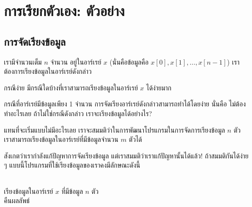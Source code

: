 \chapter{การ{\wbr}เรียก{\wbr}ตัวเอง: ตัวอย่าง}

\section{การ{\wbr}จัดเรียง{\wbr}ข้อมูล}

เรา{\wbr}มี{\wbr}จำนวนเต็ม $n$ จำนวน อยู่{\wbr}ใน{\wbr}อาร์เรย์ $x$ (นั่น{\wbr}คือ{\wbr}ข้อมูล{\wbr}คือ{\wbr}
$x[0],x[1],\ldots,x[n-1]$) เรา{\wbr}ต้องการ{\wbr}เรียง{\wbr}ข้อมูล{\wbr}ใน{\wbr}อาร์เรย์{\wbr}ดังกล่าว{\wbr}

\begin{quiz}{กรณี{\wbr}ง่าย}
มี{\wbr}กรณี{\wbr}ใด{\wbr}บ้าง{\wbr}ที่{\wbr}เรา{\wbr}สามารถ{\wbr}เรียง{\wbr}ข้อมูล{\wbr}ใน{\wbr}อาร์เรย์ $x$ ได้{\wbr}ง่าย{\wbr}มาก{\wbr}
\end{quiz}

กรณี{\wbr}ที่{\wbr}อาร์เรย์{\wbr}มี{\wbr}ข้อมูล{\wbr}เพียง 1 จำนวน การ{\wbr}จัดเรียง{\wbr}อาร์เรย์{\wbr}ดังกล่าว{\wbr}สามารถ{\wbr}ทำ{\wbr}ได้{\wbr}โดย{\wbr}ง่าย นั่น{\wbr}คือ{\wbr}
ไม่{\wbr}ต้อง{\wbr}ทำ{\wbr}อะไร{\wbr}เลย  ถ้า{\wbr}ไม่{\wbr}ใช่{\wbr}กรณี{\wbr}ดังกล่าว เรา{\wbr}จะ{\wbr}เรียง{\wbr}ข้อมูล{\wbr}ได้{\wbr}อย่างไร?

แทน{\wbr}ที่{\wbr}จะ{\wbr}เริ่ม{\wbr}แบบ{\wbr}ไม่{\wbr}มี{\wbr}อะไร{\wbr}เลย เรา{\wbr}จะ{\wbr}สมมติ{\wbr}ว่า{\wbr}ใน{\wbr}การ{\wbr}พัฒนา{\wbr}โปรแกรม{\wbr}ใน{\wbr}การ{\wbr}จัดการ{\wbr}เรียง{\wbr}ข้อมูล{\wbr}
$n$ ตัว เรา{\wbr}สามารถ{\wbr}เรียง{\wbr}ข้อมูล{\wbr}ใน{\wbr}อาร์เรย์{\wbr}ที่{\wbr}มี{\wbr}ข้อมูล{\wbr}จำนวน $m$ ตัว{\wbr}ได้{\wbr}

สังเกต{\wbr}ว่า{\wbr}เรา{\wbr}กำลัง{\wbr}แก้{\wbr}ปัญหา{\wbr}การ{\wbr}จัดเรียง{\wbr}ข้อมูล แต่{\wbr}เรา{\wbr}สมมติ{\wbr}ว่า{\wbr}เรา{\wbr}แก้{\wbr}ปัญหา{\wbr}นั้น{\wbr}ได้{\wbr}แล้ว!
ถ้า{\wbr}สมมติ{\wbr}กัน{\wbr}ได้{\wbr}ง่าย ๆ แบบ{\wbr}นี้{\wbr}โปรแกรม{\wbr}ที่{\wbr}ใช้{\wbr}เรียง{\wbr}ข้อมูล{\wbr}ของ{\wbr}เรา{\wbr}คง{\wbr}มี{\wbr}ลักษณะ{\wbr}ดังนี้{\wbr}

\begin{algt}
\\
\hspace*{0.2in} เรียง{\wbr}ข้อมูล{\wbr}ใน{\wbr}อาร์เรย์ $x$ ที่{\wbr}มี{\wbr}ข้อมูล $n$ ตัว\\
\hspace*{0.2in} คืน{\wbr}ผลลัพธ์{\wbr}
\end{algt}

